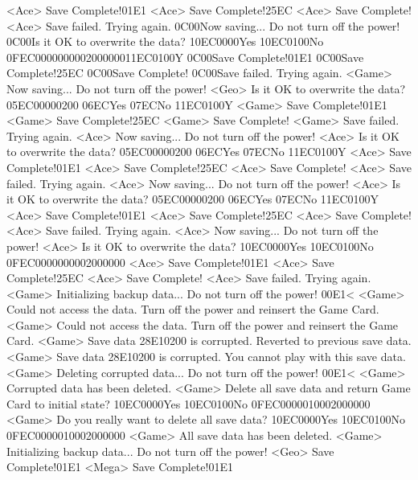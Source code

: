 <Ace> Save Complete!{01}{E1}
<Ace> Save Complete!{25}{EC}
<Ace> Save Complete! 
<Ace> Save failed. Trying again. 
{0C}{00}Now saving... Do not turn off the power!
{0C}{00}Is it OK to overwrite the data? {10}{EC}{00}{00}Yes {10}{EC}{01}{00}No {0F}{EC}{00}{00}{00}{00}{02}{00}{00}{00}{11}{EC}{01}{00}Y
{0C}{00}Save Complete!{01}{E1}
{0C}{00}Save Complete!{25}{EC}
{0C}{00}Save Complete! 
{0C}{00}Save failed. Trying again. 
<Game> Now saving... Do not turn off the power!
<Geo> Is it OK to overwrite the data? {05}{EC}{00}{00}{02}{00}  {06}{EC}Yes  {07}{EC}No 
{11}{EC}{01}{00}Y
<Game> Save Complete!{01}{E1}
<Game> Save Complete!{25}{EC}
<Game> Save Complete! 
<Game> Save failed. Trying again. 
<Ace> Now saving... Do not turn off the power!
<Ace> Is it OK to overwrite the data? {05}{EC}{00}{00}{02}{00}  {06}{EC}Yes  {07}{EC}No 
{11}{EC}{01}{00}Y
<Ace> Save Complete!{01}{E1}
<Ace> Save Complete!{25}{EC}
<Ace> Save Complete! 
<Ace> Save failed. Trying again. 
<Ace> Now saving... Do not turn off the power!
<Ace> Is it OK to overwrite the data? {05}{EC}{00}{00}{02}{00}  {06}{EC}Yes  {07}{EC}No 
{11}{EC}{01}{00}Y
<Ace> Save Complete!{01}{E1}
<Ace> Save Complete!{25}{EC}
<Ace> Save Complete! 
<Ace> Save failed. Trying again. 
<Ace> Now saving... Do not turn off the power!
<Ace> Is it OK to overwrite the data? {10}{EC}{00}{00}Yes {10}{EC}{01}{00}No {0F}{EC}{00}{00}{00}{00}{02}{00}{00}{00}
<Ace> Save Complete!{01}{E1}
<Ace> Save Complete!{25}{EC}
<Ace> Save Complete! 
<Ace> Save failed. Trying again. 
<Game> Initializing backup data... Do not turn off the power! {00}{E1}<
<Game> Could not access the data. Turn off the power and reinsert the Game Card.
<Game> Could not access the data. Turn off the power and reinsert the Game Card.
<Game> Save data {28}{E1}{02}{00} is corrupted. Reverted to previous save data. 
<Game> Save data {28}{E1}{02}{00} is corrupted. You cannot play with this save data. 
<Game> Deleting corrupted data... Do not turn off the power! {00}{E1}<
<Game> Corrupted data has been deleted. 
<Game> Delete all save data and return Game Card to initial state? {10}{EC}{00}{00}Yes {10}{EC}{01}{00}No {0F}{EC}{00}{00}{01}{00}{02}{00}{00}{00}
<Game> Do you really want to delete all save data? {10}{EC}{00}{00}Yes {10}{EC}{01}{00}No {0F}{EC}{00}{00}{01}{00}{02}{00}{00}{00}
<Game> All save data has been deleted. 
<Game> Initializing backup data... Do not turn off the power!
<Geo> Save Complete!{01}{E1}
<Mega> Save Complete!{01}{E1}

